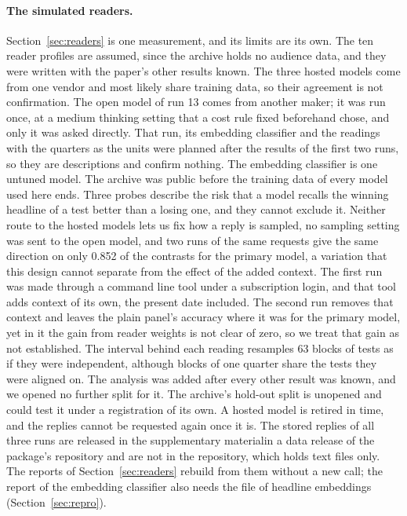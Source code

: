 \paragraph{The simulated readers.} Section~\ref{sec:readers} is one measurement, and its limits are its own. The ten reader profiles are assumed, since the archive holds no audience data, and they were written with the paper's other results known. The three hosted models come from one vendor and most likely share training data, so their agreement is not confirmation. The open model of run 13 comes from another maker; it was run once, at a medium thinking setting that a cost rule fixed beforehand chose, and only it was asked directly. That run, its embedding classifier and the readings with the quarters as the units were planned after the results of the first two runs, so they are descriptions and confirm nothing. The embedding classifier is one untuned model. The archive was public before the training data of every model used here ends. Three probes describe the risk that a model recalls the winning headline of a test better than a losing one, and they cannot exclude it. Neither route to the hosted models lets us fix how a reply is sampled, no sampling setting was sent to the open model, and two runs of the same requests give the same direction on only 0.852 of the contrasts for the primary model, a variation that this design cannot separate from the effect of the added context. The first run was made through a command line tool under a subscription login, and that tool adds context of its own, the present date included. The second run removes that context and leaves the plain panel's accuracy where it was for the primary model, yet in it the gain from reader weights is not clear of zero, so we treat that gain as not established. The interval behind each reading resamples 63 blocks of tests as if they were independent, although blocks of one quarter share the tests they were aligned on. The analysis was added after every other result was known, and we opened no further split for it. The archive's hold-out split is unopened and could test it under a registration of its own. A hosted model is retired in time, and the replies cannot be requested again once it is. The stored replies of all three runs are released \iftmlr{}in the supplementary material\else{}in a data release of the package's repository\fi{} and are not in the repository, which holds text files only. The reports of Section~\ref{sec:readers} rebuild from them without a new call; the report of the embedding classifier also needs the file of headline embeddings (Section~\ref{sec:repro}).

